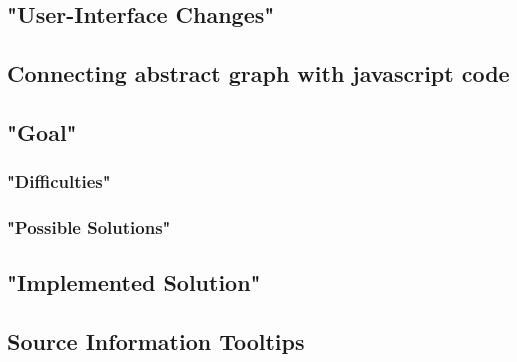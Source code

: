 \subsection{"User-Interface Changes"}
	
\subsection{Connecting abstract graph with javascript code}
	\subsection{"Goal"}
	\subsubsection{"Difficulties"}
	
	\subsubsection{"Possible Solutions"}
	
	\subsection{"Implemented Solution"}
	
		\subsection{Source Information Tooltips}
	
